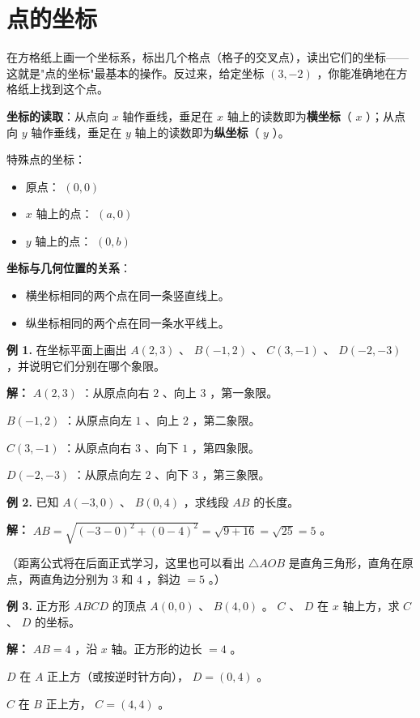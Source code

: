 \section*{点的坐标}


\begin{explore}


在方格纸上画一个坐标系，标出几个格点（格子的交叉点），读出它们的坐标——这就是"点的坐标"最基本的操作。反过来，给定坐标 $(3, -2)$ ，你能准确地在方格纸上找到这个点。

\end{explore}

\begin{understand}


\textbf{坐标的读取}：从点向 $x$ 轴作垂线，垂足在 $x$ 轴上的读数即为\textbf{横坐标}（ $x$ ）；从点向 $y$ 轴作垂线，垂足在 $y$ 轴上的读数即为\textbf{纵坐标}（ $y$ ）。

特殊点的坐标：
\begin{itemize}
  \item 原点： $(0, 0)$
  \item $x$ 轴上的点： $(a, 0)$
  \item $y$ 轴上的点： $(0, b)$
\end{itemize}


\textbf{坐标与几何位置的关系}：
\begin{itemize}
  \item 横坐标相同的两个点在同一条竖直线上。
  \item 纵坐标相同的两个点在同一条水平线上。
\end{itemize}


\end{understand}

\begin{workedexamples}


\textbf{例 1.} 在坐标平面上画出 $A(2, 3)$ 、 $B(-1, 2)$ 、 $C(3, -1)$ 、 $D(-2, -3)$ ，并说明它们分别在哪个象限。

\textbf{解：}
$A(2, 3)$ ：从原点向右 $2$ 、向上 $3$ ，第一象限。

$B(-1, 2)$ ：从原点向左 $1$ 、向上 $2$ ，第二象限。

$C(3, -1)$ ：从原点向右 $3$ 、向下 $1$ ，第四象限。

$D(-2, -3)$ ：从原点向左 $2$ 、向下 $3$ ，第三象限。

\textbf{例 2.} 已知 $A(-3, 0)$ 、 $B(0, 4)$ ，求线段 $AB$ 的长度。

\textbf{解：}
$AB = \sqrt{(-3-0)^2 + (0-4)^2} = \sqrt{9 + 16} = \sqrt{25} = 5$ 。

（距离公式将在后面正式学习，这里也可以看出 $\triangle AOB$ 是直角三角形，直角在原点，两直角边分别为 $3$ 和 $4$ ，斜边 $= 5$ 。）

\textbf{例 3.} 正方形 $ABCD$ 的顶点 $A(0,0)$ 、 $B(4,0)$ 。 $C$ 、 $D$ 在 $x$ 轴上方，求 $C$ 、 $D$ 的坐标。

\textbf{解：}
$AB = 4$ ，沿 $x$ 轴。正方形的边长 $= 4$ 。

$D$ 在 $A$ 正上方（或按逆时针方向）， $D = (0, 4)$ 。

$C$ 在 $B$ 正上方， $C = (4, 4)$ 。

\end{workedexamples}

